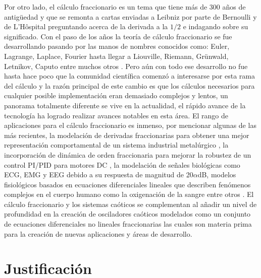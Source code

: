 	Por otro lado, el cálculo fraccionario es un tema que tiene más de 300 años de antigüedad y que se remonta a cartas enviadas a Leibniz por parte de Bernoulli y de L'Hôspital preguntando acerca de la derivada a la $1/2$ e indagando sobre su significado. Con el paso de los años la teoría de cálculo fraccionario se fue desarrollando pasando por las manos de nombres conocidos como: Euler, Lagrange, Laplace, Fourier hasta llegar a Liouville, Riemann, Grünwald, Letnikov, Caputo entre muchos otros \cite{Petras2011}. Pero aún con todo ese desarrollo no fue hasta hace poco que la comunidad científica comenzó a interesarse por esta rama del cálculo y la razón principal de este cambio es que los cálculos necesarios para cualquier posible implementación eran demasiado complejos y lentos, un panorama totalmente diferente se vive en la actualidad, el rápido avance de la tecnología ha logrado realizar avances notables en esta área. El rango de aplicaciones para el cálculo fraccionario es inmenso, por mencionar algunas de las más recientes, la modelación de derivadas fraccionarias para obtener una mejor representación comportamental de un sistema industrial metalúrgico \cite{Petras2019}, la incorporación de dinámica de orden fraccionaria para mejorar la robustez de un control PI/PID para motores DC \cite{Tepljakov2016,Khubalkar2018}, la modelación de señales biológicas como ECG, EMG y EEG debido a su respuesta de magnitud de 20$\alpha$dB, modelos fisiológicos basados en ecuaciones diferenciales lineales que describen fenómenos complejos en el cuerpo humano como la oxigenación de la sangre entre otros \cite{Ortigueira2011}.
	El cálculo fraccionario y los sistemas caóticos se complementan al añadir un nivel de profundidad en la creación de osciladores caóticos modelados como un conjunto de ecuaciones diferenciales no lineales fraccionarias las cuales son materia prima para la creación de nuevas aplicaciones y áreas de desarrollo. 
	
	\section{Justificación}
	
